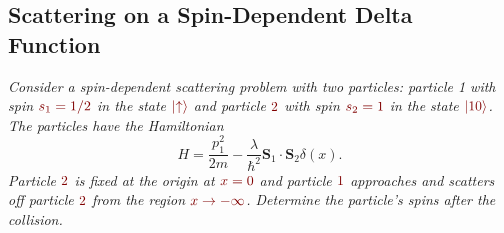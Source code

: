 \documentclass[11pt, a4paper]{article}
\newcommand{\dmath}[1]{\textcolor{Maroon}{#1}}  %
\renewcommand{\vec}[1]{\bm{#1}} %
\newcommand{\ua}{\uparrow}  %
\begin{document}
	
\subsection{Scattering on a Spin-Dependent Delta Function}
\textit{Consider a spin-dependent scattering problem with two particles: particle 1 with spin $ \dmath{s_{1} = 1/2} $ in the state $ \dmath{\ket{\ua}} $ and particle $ \dmath{2} $ with spin $ \dmath{s_{2} = 1} $ in the state $ \dmath{\ket{10}} $. The particles have the Hamiltonian}
\begin{equation*}
	H = \frac{p_{1}^{2}}{2m} - \frac{\lambda}{\hbar^{2}}\vec{S}_{1}\cdot \vec{S}_{2}\delta(x).
\end{equation*}
\textit{Particle $ \dmath{2} $ is fixed at the origin at $ \dmath{x = 0} $ and particle $ \dmath{1} $ approaches and scatters off particle $ \dmath{2} $ from the region $ \dmath{x \to -\infty} $. Determine the particle's spins after the collision.}
\end{document}
